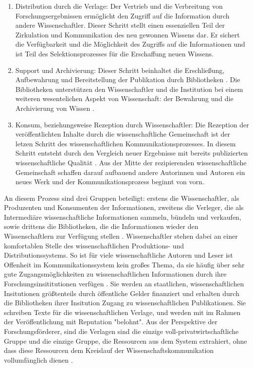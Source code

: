 \begin{enumerate}
\item Distribution durch die Verlage:
Der Vertrieb und die Verbreitung von Forschungsergebnissen ermöglicht den Zugriff auf die Information durch andere Wissenschaftler. Dieser Schritt stellt einen essenziellen Teil der Zirkulation und Kommunikation des neu gewonnen Wissens dar\cite{cite:11i}. Er sichert die Verfügbarkeit und die Möglichkeit des Zugriffs auf die Informationen und ist Teil des Selektionsprozesses für die Erschaffung neuen Wissens.\cite{cite:11l}
\item Support und Archivierung:
Dieser Schritt beinhaltet die Erschließung, Aufbewahrung und Bereitstellung der Publikation durch Bibliotheken \cite{schirmbacher_2009_wisspub}. Die Bibliotheken unterstützen den Wissenschaftler und die Institution bei einem weiteren wesentelichen Aspekt von Wissenschaft: der Bewahrung und die Archivierung von Wissen \cite{K_lbel_2002}.
\item Konsum, beziehungsweise Rezeption durch Wissenschaftler:
Die Rezeption der veröffentlichten Inhalte durch die wissenschaftliche Gemeinschaft \cite{schirmbacher_2009_wisspub} ist der letzen Schritt des wissenschaftlichen Kommunikationsprozesses. In diesem Schritt entsteht durch den Vergleich neuer Ergebnisse mit bereits publizierten wissenschaftliche Qualität \cite{umstatter_2007_qualitatssicherung}. Aus der Mitte der rezipierenden wissenschaftliche Gemeinschaft schaffen darauf aufbauend andere Autorinnen und Autoren ein neues Werk \cite{cite:11k} \cite{schirmbacher_2009_wisspub} und der Kommunikationsprozess beginnt von vorn.
\end{enumerate}

An diesem Prozess sind drei Gruppen beteiligt: erstens die Wissenschaftler, als Produzenten und Konsumenten der Informationen, zweitens die Verleger, die als Intermediäre wissenschaftliche Informationen sammeln, bündeln und verkaufen, sowie drittens die Bibliotheken, die die Informationen wieder den Wissenschaftlern zur Verfügung stellen \cite{Odlyzko_1997}. Wissenschaftler stehen dabei an einer komfortablen Stelle des wissenschaftlichen Produktions- und Distributionssystems\cite{herb_2010}. So ist für viele wissenschaftliche Autoren und Leser ist Offenheit im Kommunikationssystem kein großes Thema, da sie häufig über sehr gute Zugangsmöglichkeiten zu wissenschaftlichen Informationen durch ihre Forschungsinsititutionen verfügen \cite{cope2014future}. Sie werden an staatlichen, wissenschaftlichen Insitutionen größtenteils durch öffentliche Gelder finanziert und erhalten durch die Bibliotheken ihrer Insitution Zugang zu wissenschaftlichen Publikationen. Sie schreiben Texte für die wissenschaftlichen Verlage, und werden mit im Rahmen der Veröffentlichung mit Reputation "belohnt". Aus der Perspektive der Forschungsförderer, sind die Verlagen sind die einzige voll-privatwirtschaftliche Gruppe und die einzige Gruppe, die Ressourcen aus dem System extrahiert, ohne dass diese Ressourcen dem Kreislauf der Wissenschaftskommunikation vollumfänglich dienen \cite{kiley_2006_open}.


